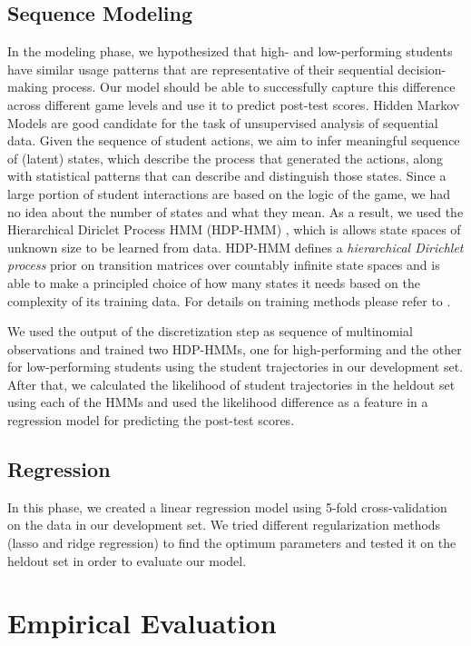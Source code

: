 \documentclass{sigchi}
\begin{document}
\subsection{Sequence Modeling}
In the modeling phase, we hypothesized that high- and low-performing students have similar usage patterns that are representative of their sequential decision-making process. 
Our model should be able to successfully capture this difference across different game levels and use it to predict post-test scores.
Hidden Markov Models are good candidate for the task of unsupervised analysis of sequential data.
Given the sequence of student actions, we aim to infer meaningful sequence of (latent) states, which describe the process that generated the actions, along with statistical patterns that can describe and distinguish those states.
Since a large portion of student interactions are based on the logic of the game, we had no idea about the number of states and what they mean.
As a result, we used the Hierarchical Diriclet Process HMM (HDP-HMM) \cite{fox2008hdp}, which is allows state spaces of unknown size to be learned from data. 
HDP-HMM defines a \textit{hierarchical Dirichlet process} prior on transition matrices over countably infinite state spaces and is able to make a principled choice of how many states it needs based on the complexity of its training data. 
For details on training methods please refer to \cite{fox2008hdp}.

We used the output of the discretization step as sequence of multinomial observations and trained two HDP-HMMs, one for high-performing and the other for low-performing students using the student trajectories in our development set. After that, we calculated the likelihood of student trajectories in the heldout set using each of the HMMs and used the likelihood difference as a feature in a regression model for predicting the post-test scores.

\subsection{Regression}

In this phase, we created a linear regression model using 5-fold cross-validation on the data in our development set. We tried different regularization methods (lasso and ridge regression) to find the optimum parameters and tested it on the heldout set in order to evaluate our model. 

\section{Empirical Evaluation}
\end{document}
